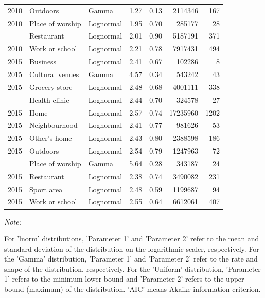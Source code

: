 \documentclass[preprint, 3p,
authoryear]{elsarticle} %
\begin{document}
\begin{table}
{\begin{threeparttable}
\begin{tabular}[t]{rllrrrr}
2010 & Outdoors & Gamma & 1.27 & 0.13 & 2114346 & 167\\
2010 & Place of worship & Lognormal & 1.95 & 0.70 & 285177 & 28\\
\addlinespace
2010 & Restaurant & Lognormal & 2.01 & 0.90 & 5187191 & 371\\
2010 & Work or school & Lognormal & 2.21 & 0.78 & 7917431 & 494\\
2015 & Business & Lognormal & 2.41 & 0.67 & 102286 & 8\\
2015 & Cultural venues & Gamma & 4.57 & 0.34 & 543242 & 43\\
2015 & Grocery store & Lognormal & 2.48 & 0.68 & 4001111 & 338\\
\addlinespace
2015 & Health clinic & Lognormal & 2.44 & 0.70 & 324578 & 27\\
2015 & Home & Lognormal & 2.57 & 0.74 & 17235960 & 1202\\
2015 & Neighbourhood & Lognormal & 2.41 & 0.77 & 981626 & 53\\
2015 & Other's home & Lognormal & 2.43 & 0.80 & 2388598 & 186\\
2015 & Outdoors & Lognormal & 2.54 & 0.79 & 1247963 & 72\\
\addlinespace
2015 & Place of worship & Gamma & 5.64 & 0.28 & 343187 & 24\\
2015 & Restaurant & Lognormal & 2.38 & 0.74 & 3490082 & 231\\
2015 & Sport area & Lognormal & 2.48 & 0.59 & 1199687 & 94\\
2015 & Work or school & Lognormal & 2.55 & 0.64 & 6612061 & 407\\
\bottomrule
\end{tabular}
\begin{tablenotes}
\item \textit{Note: } 
\item For 'lnorm' distributions, 'Parameter 1' and 'Parameter 2' refer to the mean and standard deviation of the distribution on the logarithmic scaler, respectively. For the 'Gamma' distribution, 'Parameter 1' and 'Parameter 2' refer to the rate and shape of the distribution, respectively. For the 'Uniform' distribution,  'Parameter 1' refers to the minimum lower bound and 'Parameter 2'  refers to the upper bound (maximum) of the distribution.  'AIC' means Akaike information criterion.
\end{tablenotes}
\end{threeparttable}}
\end{table}
\end{document}
